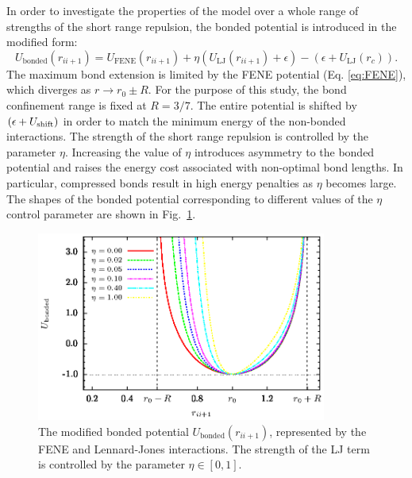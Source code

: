 \documentclass[12pt]{report}
\begin{document}
In order to investigate the properties of the model over a whole range of strengths of the short range repulsion, the bonded potential is introduced in the modified form:
%
\begin{equation}
\label{eq:BondedInteractionModified}
U_{\mathrm{bonded}}(r_{ii+1}) = U_{\mathrm{FENE}}(r_{ii+1}) + \eta \left(U_{\mathrm{LJ}}(r_{ii+1}) + \epsilon\right) - \left(\epsilon + U_{\mathrm{LJ}}(r_{c})\right).
\end{equation}
%
The maximum bond extension is limited by the FENE potential (Eq.\,\,\ref{eq:FENE}), which diverges as $r \rightarrow r_0 \pm R$. For the purpose of this study, the bond confinement range is fixed at $R = 3/7$. The entire potential is shifted by $(\epsilon+U_{\rm shift})$ in order to match the minimum energy of the non-bonded interactions. The strength of the short range repulsion is controlled by the parameter $\eta$. Increasing the value of $\eta$ introduces asymmetry to the bonded potential and raises the energy cost associated with non-optimal bond lengths. In particular, compressed bonds result in high energy penalties as $\eta$ becomes large. The shapes of the bonded potential corresponding to different values of the $\eta$ control parameter are shown in Fig.~\ref{fig:modifiedBondedPotential}. 
%
\begin{figure}
\center
\includegraphics[width=0.85\textwidth]{chapter6Figs/bondedInter.eps}\hspace{2pc}%
\caption{\label{fig:modifiedBondedPotential} The modified bonded potential $U_{\mathrm{bonded}}(r_{ii+1})$, represented by the FENE and Lennard-Jones interactions. The strength of the LJ term is controlled by the parameter $\eta \in [0,1]$.}
\end{figure}
\end{document}
